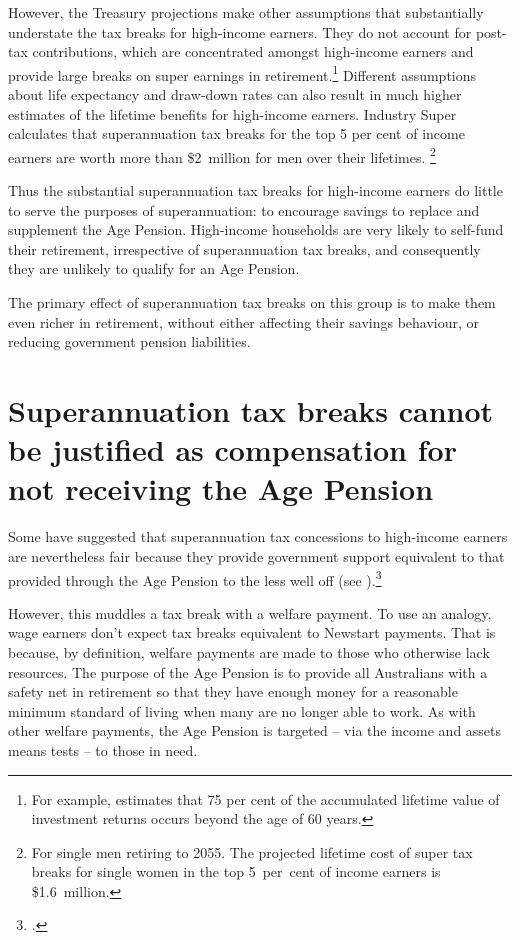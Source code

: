 However, the Treasury projections make other assumptions that substantially understate the tax breaks for high-income earners. They do not account for post-tax contributions, which are concentrated amongst high-income earners and provide large breaks on super earnings in retirement.\footnote{For example, \textcite{Blayney2015} estimates that 75 per cent of the accumulated lifetime value of investment returns occurs beyond the age of 60 years.}  Different assumptions about life expectancy and draw-down rates can also result in much higher estimates of the lifetime benefits for high-income earners.  Industry Super calculates that superannuation tax breaks for the top 5 per cent of income earners are worth more than \$2~million for men over their lifetimes.%
\footnote{For single men retiring to 2055. The projected lifetime cost of super tax breaks for single women in the top 5~per~cent of income earners is \$1.6~million.} 

Thus the substantial superannuation tax breaks for high-income earners do little to serve the purposes of superannuation: to encourage savings to replace and supplement the Age Pension. High-income households are very likely to self-fund their retirement, irrespective of superannuation tax breaks, and consequently they are unlikely to qualify for an Age Pension. 

The primary effect of superannuation tax breaks on this group is to make them even richer in retirement, without either affecting their savings behaviour, or reducing government pension liabilities.

\section{Superannuation tax breaks cannot be justified as compensation for not receiving the Age Pension}\label{sec:SUPER-3-6}
Some have suggested that superannuation tax concessions to high-income earners are nevertheless fair because they provide government support equivalent to that provided through the Age Pension to the less well off (see ).\footcite[][46]{ASFA2015TreasurySubmission}  

However, this muddles a tax break with a welfare payment. To use an analogy, wage earners don’t expect tax breaks equivalent to Newstart payments. That is because, by definition, welfare payments are made to those who otherwise lack resources. The purpose of the Age Pension is to provide all Australians with a safety net in retirement so that they have enough money for a reasonable minimum standard of living when many are no longer able to work. As with other welfare payments, the Age Pension is targeted – via the income and assets means tests – to those in need. 

